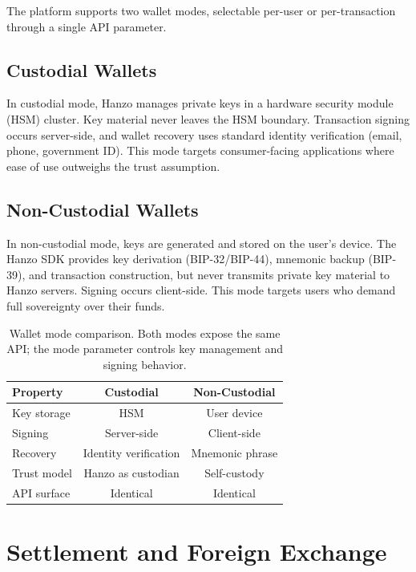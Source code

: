 \documentclass[11pt,letterpaper]{article}
\begin{document}
The platform supports two wallet modes, selectable per-user or per-transaction
through a single API parameter.

\subsection{Custodial Wallets}

In custodial mode, Hanzo manages private keys in a hardware security module
(HSM) cluster.  Key material never leaves the HSM boundary.  Transaction
signing occurs server-side, and wallet recovery uses standard identity
verification (email, phone, government ID).  This mode targets consumer-facing
applications where ease of use outweighs the trust assumption.

\subsection{Non-Custodial Wallets}

In non-custodial mode, keys are generated and stored on the user's device.
The Hanzo SDK provides key derivation (BIP-32/BIP-44), mnemonic backup
(BIP-39), and transaction construction, but never transmits private key
material to Hanzo servers.  Signing occurs client-side.  This mode targets
users who demand full sovereignty over their funds.

\begin{table}[H]
\centering
\small
\begin{tabular}{lcc}
\toprule
\textbf{Property} & \textbf{Custodial} & \textbf{Non-Custodial} \\
\midrule
Key storage & HSM & User device \\
Signing & Server-side & Client-side \\
Recovery & Identity verification & Mnemonic phrase \\
Trust model & Hanzo as custodian & Self-custody \\
API surface & Identical & Identical \\
\bottomrule
\end{tabular}
\caption{Wallet mode comparison.  Both modes expose the same API; the mode
parameter controls key management and signing behavior.}
\label{tab:wallets}
\end{table}

\section{Settlement and Foreign Exchange}
\label{sec:settlement}
\end{document}
